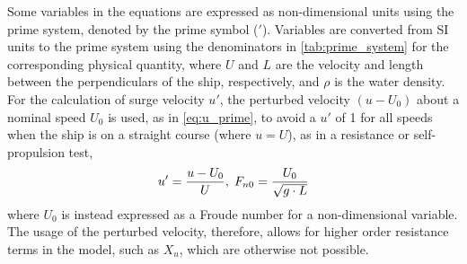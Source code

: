 \noindent Some variables in the equations are expressed as non-dimensional units using the prime system, denoted by the prime symbol ($'$). Variables are converted from SI units to the prime system using the denominators in \autoref{tab:prime_system} for the corresponding physical quantity, where $U$ and $L$ are the velocity and length between the perpendiculars of the ship, respectively, and $\rho$ is the water density.
For the calculation of surge velocity $u'$, the perturbed velocity $(u-U_0)$ about a nominal speed $U_0$ is used, as in \autoref{eq:u_prime}, to avoid a $u'$ of 1 for all speeds when the ship is on a straight course (where $u=U$), as in a resistance or self-propulsion test, 
\begin{equation}
    \label{eq:u_prime}
    u' = \frac{u-U_0}{U}, \hspace{0.1cm}
    F_{n0} = \frac{U_0}{\sqrt{g \cdot L}}
\end{equation}
where $U_0$ is instead expressed as a Froude number for a non-dimensional variable.
The usage of the perturbed velocity, therefore, allows for higher order resistance terms in the model, such as $X_{u}$, which are otherwise not possible. 